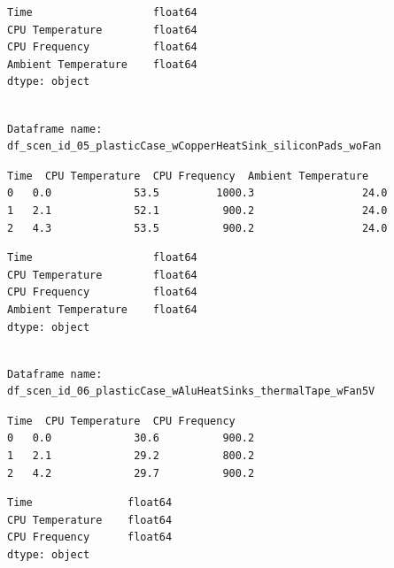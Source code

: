 \documentclass[10pt,parskip=half,
toc=sectionentrywithdots,
bibliography=totocnumbered,
captions=tableheading,numbers=noendperiod]{scrartcl}
\begin{document}
\begin{lstlisting}[language={},postbreak={},numbers=none,xrightmargin=7pt,breakindent=0pt,aboveskip=5pt,belowskip=5pt]
Time                   float64
CPU Temperature        float64
CPU Frequency          float64
Ambient Temperature    float64
dtype: object
\end{lstlisting}

\begin{lstlisting}[language={},postbreak={},numbers=none,xrightmargin=7pt,belowskip=5pt,aboveskip=5pt,breakindent=0pt]

Dataframe name: df_scen_id_05_plasticCase_wCopperHeatSink_siliconPads_woFan

\end{lstlisting}

\begin{lstlisting}[language={},postbreak={},numbers=none,xrightmargin=7pt,breakindent=0pt,aboveskip=5pt,belowskip=5pt]
   Time  CPU Temperature  CPU Frequency  Ambient Temperature
0   0.0             53.5         1000.3                 24.0
1   2.1             52.1          900.2                 24.0
2   4.3             53.5          900.2                 24.0
\end{lstlisting}

\begin{lstlisting}[language={},postbreak={},numbers=none,xrightmargin=7pt,breakindent=0pt,aboveskip=5pt,belowskip=5pt]
Time                   float64
CPU Temperature        float64
CPU Frequency          float64
Ambient Temperature    float64
dtype: object
\end{lstlisting}

\begin{lstlisting}[language={},postbreak={},numbers=none,xrightmargin=7pt,belowskip=5pt,aboveskip=5pt,breakindent=0pt]

Dataframe name: df_scen_id_06_plasticCase_wAluHeatSinks_thermalTape_wFan5V

\end{lstlisting}

\begin{lstlisting}[language={},postbreak={},numbers=none,xrightmargin=7pt,breakindent=0pt,aboveskip=5pt,belowskip=5pt]
   Time  CPU Temperature  CPU Frequency
0   0.0             30.6          900.2
1   2.1             29.2          800.2
2   4.2             29.7          900.2
\end{lstlisting}

\begin{lstlisting}[language={},postbreak={},numbers=none,xrightmargin=7pt,breakindent=0pt,aboveskip=5pt,belowskip=5pt]
Time               float64
CPU Temperature    float64
CPU Frequency      float64
dtype: object
\end{lstlisting}
\end{document}
